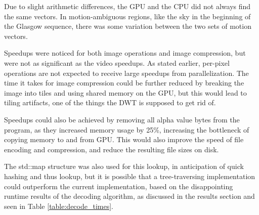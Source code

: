 \documentclass[10pt,twocolumn,twoside]{IEEEtran}
\begin{document}
Due to slight arithmetic differences, the GPU and the CPU did not always find the same vectors. In motion-ambiguous regions, like the sky in the beginning of the Glasgow sequence, there was some variation between the two sets of motion vectors.

Speedups were noticed for both image operations and image compression, but were not as significant as the video speedups. As stated earlier, per-pixel operations are not expected to receive large speedups from parallelization. The time it takes for image compression could be further reduced by breaking the image into tiles and using shared memory on the GPU, but this would lead to tiling artifacts, one of the things the DWT is supposed to get rid of.

Speedups could also be achieved by removing all alpha value bytes from the program, as they increased memory usage by 25\%, increasing the bottleneck of copying memory to and from GPU. This would also improve the speed of file encoding and compression, and reduce the resulting file sizes on disk.

The std::map structure was also used for this lookup, in anticipation of quick hashing and thus lookup, but it is possible that a tree-traversing implementation could outperform the current implementation, based on the disappointing runtime results of the decoding algorithm, as discussed in the results section and seen in Table \ref{table:decode_times}.




\end{document}
